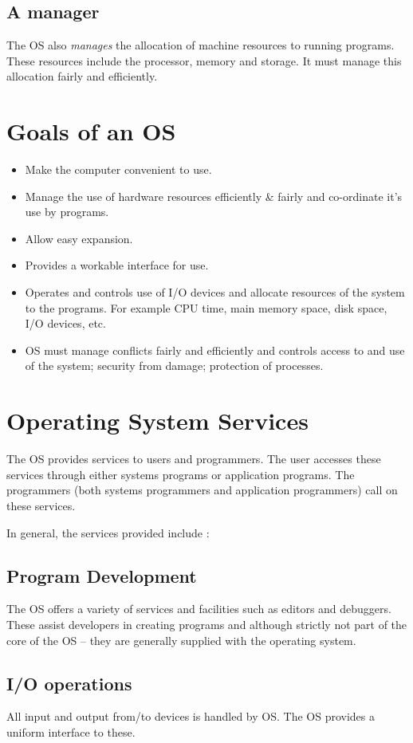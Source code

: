 \documentclass[10pt,a4paper,openany]{book}
\begin{document}
    \subsection*{A manager}
    The OS also \textit{manages} the allocation of machine resources to running programs. These resources include the processor, memory and storage. It must manage this allocation fairly and efficiently.

    \section{Goals of an OS}
    \begin{itemize}
    \item Make the computer convenient to use.
    \item Manage the use of hardware resources efficiently \& fairly and co-ordinate it's use by programs.
    \item Allow easy expansion.
    \item Provides a workable interface for use.
    \item Operates and controls use of I/O devices and allocate resources of the system to the programs. For example CPU time, main memory space, disk space, I/O devices, etc.
    \item OS must manage conflicts fairly and efficiently and controls access to and use of the system; security from damage; protection of processes.
    \end{itemize}

    \section{Operating System Services}
    The OS provides services to users and programmers. The user accesses these services through either systems programs or application programs. The programmers (both systems programmers and application programmers) call on these services.

    In general, the services provided include :
    \subsection*{Program Development}
    The OS offers a variety of services and facilities such as editors and debuggers. These assist developers in creating programs and although strictly not part of the core of the OS – they are generally supplied with the operating system.

    \subsection*{I/O operations}
    All input and output from/to devices is handled by OS. The OS provides a uniform interface to these.
\end{document}
